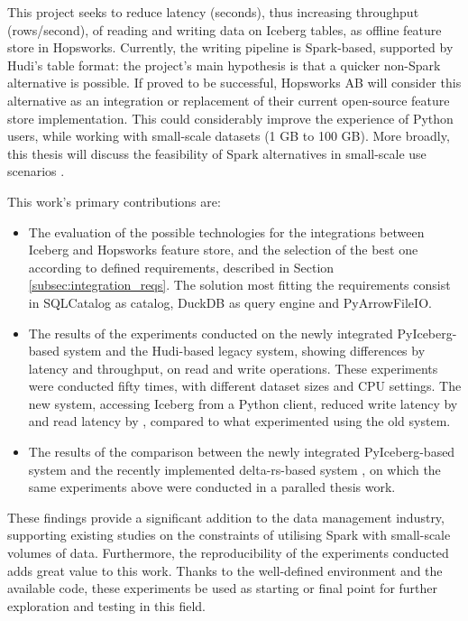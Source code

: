 This project seeks to reduce latency (seconds), thus increasing throughput (rows/second), of reading and writing data on Iceberg tables, as offline feature store in Hopsworks. Currently, the writing pipeline is Spark-based, supported by Hudi's table format: the project's main hypothesis is that a quicker non-Spark alternative is possible. If proved to be successful, Hopsworks AB will consider this alternative as an integration or replacement of their current open-source feature store implementation. This could considerably improve the experience of Python users, while working with small-scale datasets (1 GB to 100 GB). More broadly, this thesis will discuss the feasibility of Spark alternatives in small-scale use scenarios \cite{manfrediReducingReadWrite2024}.


This work's primary contributions are:
\begin{itemize}
    \item The evaluation of the possible technologies for the integrations between Iceberg and Hopsworks feature store, and the selection of the best one according to defined requirements, described in Section \ref{subsec:integration_reqs}. The solution most fitting the requirements consist in SQLCatalog as catalog, DuckDB as query engine and PyArrowFileIO.
    \item The results of the experiments conducted on the newly integrated PyIceberg-based system and the Hudi-based legacy system, showing differences by latency and throughput, on read and write operations. These experiments were conducted fifty times, with different dataset sizes and \gls{CPU} settings. The new system, accessing Iceberg from a Python client, reduced write latency by  and read latency by , compared to what experimented using the old system.
    \item The results of the comparison between the newly integrated PyIceberg-based system and the recently implemented delta-rs-based system \cite{manfrediReducingReadWrite2024}, on which the same experiments above were conducted in a paralled thesis work. 
\end{itemize}

These findings provide a significant addition to the data management industry, supporting existing studies on the constraints of utilising Spark with small-scale volumes of data. Furthermore, the reproducibility of the experiments conducted adds great value to this work. Thanks to the well-defined environment and the available code, these experiments be used as starting or final point for further exploration and testing in this field.